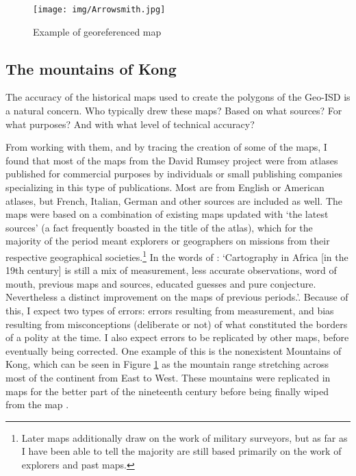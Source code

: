 \documentclass[12pt]{article}
\begin{document}

\begin{figure}[h!tpb]
	\centering
	\texttt{[image: img/Arrowsmith.jpg]}
	\caption{Example of georeferenced map}%
	\label{Arrowsmith}
\end{figure}


\subsection{The mountains of Kong}

The accuracy of the historical maps used to create the polygons of the Geo-ISD
is a natural concern. Who typically drew these maps? Based on what sources? For
what purposes? And with what level of technical accuracy? 

From working with them, and by tracing the creation of some of the maps, I found
that most of the maps from the David Rumsey project were from atlases published
for commercial purposes by individuals or small publishing companies
specializing in this type of publications. Most are from English or American
atlases, but French, Italian, German and other sources are included as well. The
maps were based on a combination of existing maps updated with `the latest
sources' (a fact frequently boasted in the title of the atlas), which for the
majority of the period meant explorers or geographers on missions from their
respective geographical societies.\footnote{Later maps additionally draw on the
	work of military surveyors, but as far as I have been able to tell the
majority are still based primarily on the work of explorers and past maps.} In
the words of \citet[47-48]{Stone1995}: `Cartography in Africa [in the 19th
century] is still a mix of measurement, less accurate observations, word of
mouth, previous maps and sources, educated guesses and pure conjecture.
Nevertheless a distinct improvement on the maps of previous periods.'. Because
of this, I expect two types of errors: errors resulting from measurement, and
bias resulting from misconceptions (deliberate or not) of what constituted the
borders of a polity at the time. I also expect errors to be replicated by other
maps, before eventually being corrected. One example of this is the nonexistent
Mountains of Kong, which can be seen in Figure \ref{Arrowsmith} as the mountain
range stretching across most of the continent from East to West. These mountains
were replicated in maps for the better part of the nineteenth century before
being finally wiped from the map \citep{Bassett_1991}.
\end{document}
